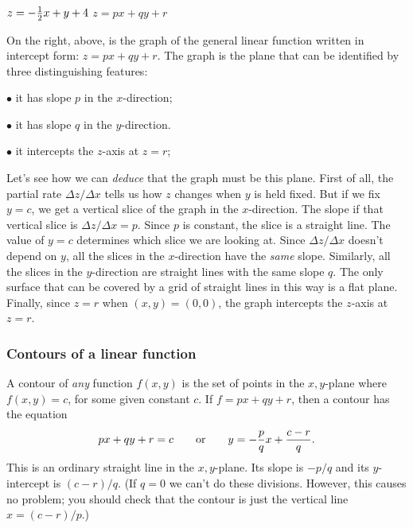{{{{{\small
	\noindent
	\hspace{40pt}
	$z = -{\textstyle {1 \over 2}} x  + y + 4$
	\hspace{135pt}
	$z = px + qy + r$
}
\vspace{10pt}

	On the right, above, is the graph of the general linear function written in intercept form: $z = px + qy + r$.  The graph is the plane that can be identified by three distinguishing features:

\noindent$\bullet$ it has slope $p$ in the $x$-direction;

\noindent$\bullet$ it has slope $q$ in the $y$-direction.

\noindent$\bullet$ it intercepts the $z$-axis at $z = r$; 
\smallskip
	
	Let's see how we can {\em deduce\/} 	 
that the graph must be this plane.  First of all, the partial rate $\Delta z/\Delta x$ tells us how $z$ changes when $y$ is held fixed.  But if we fix $y = c$, we get a vertical slice of the graph in the $x$-direction.  The slope if that vertical slice is $\Delta z/\Delta x = p$.  Since $p$ is constant, the slice is a straight line.  The value of $y = c$ determines which slice we are looking at.  Since $\Delta z/\Delta x$ doesn't depend on $y$, all the slices in the $x$-direction have the {\em same\/} slope.  Similarly, all the slices in the $y$-direction are straight lines with the same slope $q$.  The only surface that can be covered by a grid of straight lines in this way is a flat plane.  Finally, since $z = r$ when $(x, y) = (0, 0)$, the graph intercepts the $z$-axis at $z = r$. 

\subsubsection{Contours of a linear function}

	A contour of {\em any\/} function 
$f(x, y)$ is the set of points in the $x, y$-plane where $f(x, y) = c$, for some given constant $c$.  If $f = px + qy + r$, then a contour has the equation
	\[
px + qy + r = c \qquad \mbox{or} \qquad 
		y = -{p \over q}x + {c - r \over q}.
\]
This is an ordinary straight line in the $x, y$-plane.  Its slope is $-p/q$ and its $y$-intercept is $(c - r)/q$.  
\label{contourslope}
(If $q = 0$ we can't do these divisions.  However, this causes no problem; you should check that the contour is just the vertical line $x = (c - r)/p$.)

}}}}
